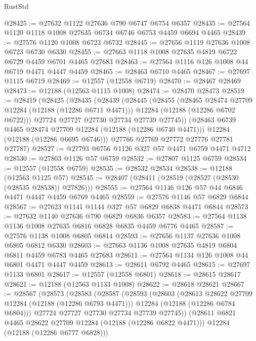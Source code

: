 \begin{lexlean}{RustStd}
\begin{coremodule}
@28425 := @27632 @1122 @27636 @790 @6747 @6754 @6357
@28435 := @27564 @1120 @1118 @1008 @27635 @6734 @6746 @6753 @4459 @6694 @4465
@28439 := @27576 @1120 @1008 @6723 @6732
@28445 := @27656 @1119 @27636 @1008 @6723 @6730 @6330
@28455 := @27663 @1118 @1008 @27635 @4819 @6722 @6729 @4459 @6701 @4465 @27683
@28463 := @27564 @1116 @126 @1008 @44 @6719 @4471 @4447 @4459
@28465 := @28463 @6710 @4465
@28467 := @27697 @1115 @6719
@28469 := @12557 (@12558 @6719)
@28470 := @28467 @28469
@28473 := @12188 (@12563 @1115 @1008)
@28474 := @28470 @28473
@28519 := @28419
    (@28425
      (@28435
        (@28439
          (@28445
            (@28455
              (@28465 @28474 @27709 @12284 (@12188 (@12286 @6711 @4471)))
              @12284
              (@12188 (@12286 @6702 @6722)))
            @27724
            @27727
            @27730
            @27734
            @27739
            @27745))
        (@28463 @6739 @4465 @28474 @27709 @12284 (@12188 (@12286 @6740 @4471)))
        @12284
        (@12188 (@12286 @6695 @6746)))
      @27766
      @27769
      @27772
      @27776
      @27781
      @27787)
@28527 := @27793 @6756 @1126 @327 @57 @4471 @6759 @4471 @4712
@28530 := @27803 @1126 @57 @6759
@28532 := @27807 @1125 @6759
@28534 := @12557 (@12558 @6759)
@28535 := @28532 @28534
@28538 := @12188 (@12563 @1125 @57)
@28545 := @28407 (@28411 (@28519 (@28527 (@28530 (@28535 @28538)) @27826)))
@28555 := @27564 @1146 @126 @57 @44 @6846 @4471 @4447 @4459 @6769 @4465
@28559 := @27576 @1146 @57 @6829 @6844
@28567 := @27623 @1141 @1144 @327 @57 @6829 @6838 @4471 @6844
@28573 := @27632 @1140 @27636 @790 @6829 @6836 @6357
@28583 := @27564 @1138 @1136 @1008 @27635 @6816 @6828 @6835 @4459 @6776 @4465
@28587 := @27576 @1138 @1008 @6805 @6814
@28593 := @27656 @1137 @27636 @1008 @6805 @6812 @6330
@28603 := @27663 @1136 @1008 @27635 @4819 @6804 @6811 @4459 @6783 @4465 @27683
@28611 := @27564 @1134 @126 @1008 @44 @6801 @4471 @4447 @4459
@28613 := @28611 @6792 @4465
@28615 := @27697 @1133 @6801
@28617 := @12557 (@12558 @6801)
@28618 := @28615 @28617
@28621 := @12188 (@12563 @1133 @1008)
@28622 := @28618 @28621
@28667 := @28567
    (@28573
      (@28583
        (@28587
          (@28593
            (@28603
              (@28613 @28622 @27709 @12284 (@12188 (@12286 @6793 @4471)))
              @12284
              (@12188 (@12286 @6784 @6804)))
            @27724
            @27727
            @27730
            @27734
            @27739
            @27745))
        (@28611 @6821 @4465 @28622 @27709 @12284 (@12188 (@12286 @6822 @4471)))
        @12284
        (@12188 (@12286 @6777 @6828)))

\end{coremodule}
\end{lexlean}
